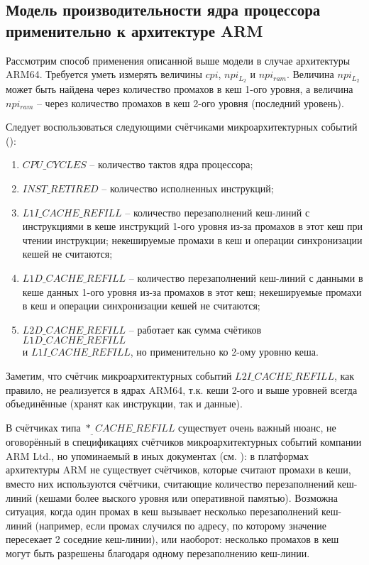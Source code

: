 \subsection{Модель производительности ядра процессора применительно к архитектуре ARM}

    Рассмотрим способ применения описанной выше модели в случае архитектуры ARM64.
    Требуется уметь измерять величины $cpi$, $npi_{L_2}$ и $npi_{ram}$. Величина $npi_{L_2}$
    может быть найдена через количество промахов в кеш 1-ого уровня, а величина $npi_{ram}$ --
    через количество промахов в кеш 2-ого уровня (последний уровень).

    Следует воспользоваться следующими счётчиками микроархитектурных событий (\cite{ArmPMUjson}):
    \begin{enumerate}
        \item $CPU\_CYCLES$ -- количество тактов ядра процессора;
        \item $INST\_RETIRED$ -- количество исполненных инструкций;
        \item $L1I\_CACHE\_REFILL$ -- количество перезаполнений кеш-линий с инструкциями в кеше
        инструкций 1-ого уровня из-за промахов в этот кеш при чтении инструкции;
        некешируемые промахи в кеш и операции синхронизации кешей не считаются;
        \item $L1D\_CACHE\_REFILL$ -- количество перезаполнений кеш-линий с данными в кеше данных
        1-ого уровня из-за промахов в этот кеш;
        некешируемые промахи в кеш и операции синхронизации кешей не считаются;
        \item $L2D\_CACHE\_REFILL$ -- работает как сумма счётиков $L1D\_CACHE\_REFILL$ \\ и
        $L1I\_CACHE\_REFILL$, но применительно ко 2-ому уровню кеша.
    \end{enumerate}

    Заметим, что счётчик микроархитектурных событий $L2I\_CACHE\_REFILL$, как правило, не реализуется
    в ядрах ARM64, т.к. кеши 2-ого и выше уровней всегда объединённые (хранят как инструкции, так и данные).

    В счётчиках типа $*_\_CACHE\_REFILL$ существует очень важный нюанс, не оговорённый
    в спецификациях счётчиков микроархитектурных событий компании ARM Ltd., но упоминаемый
    в иных документах (см. \cite{ArmPerfAnalyses}): в платформах архитектуры ARM не существует счётчиков,
    которые считают промахи в кеши, вместо них используются счётчики, считающие
    количество перезаполнений кеш-линий (кешами более выского уровня или оперативной памятью).
    Возможна ситуация, когда один промах в кеш вызывает несколько перезаполнений кеш-линий
    (например, если промах случился по адресу, по которому значение пересекает 2 соседние кеш-линии),
    или наоборот: несколько промахов в кеш могут быть разрешены благодаря одному перезаполнению кеш-линии.

